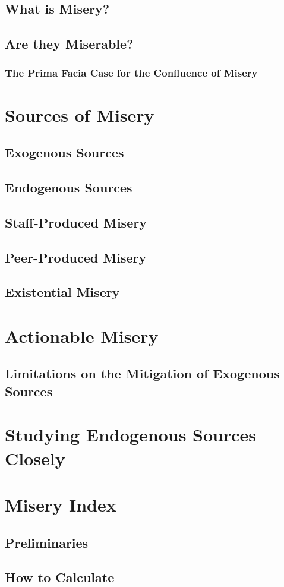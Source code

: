 \documentclass[UTF8]{article}
\begin{document}
	\subsection{What is Misery?}
	\subsection{Are they Miserable?}
	\subsubsection{The Prima Facia Case for the Confluence of Misery}

	\section{Sources of Misery}
	\subsection{Exogenous Sources}
	\subsection{Endogenous Sources}
	\subsection{Staff-Produced Misery}
	\subsection{Peer-Produced Misery}
	\subsection{Existential Misery}

	\section{Actionable Misery}
	\subsection{Limitations on the Mitigation of Exogenous Sources}
	\section{Studying Endogenous Sources Closely}
	\section{Misery Index}
	\subsection{Preliminaries}
	\subsection{How to Calculate}
\end{document}
